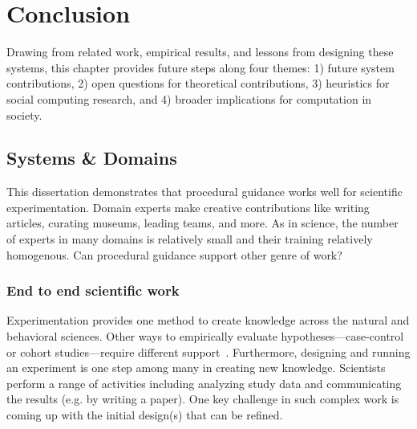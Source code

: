 
\chapter{Conclusion}
Drawing from related work, empirical results, and lessons from designing these systems, this chapter provides future steps along four themes: 1) future system contributions, 2) open questions for theoretical contributions, 3) heuristics for social computing research, and 4) broader implications for computation in society.

\section{Systems \& Domains} 

This dissertation demonstrates that procedural guidance works well for scientific experimentation. Domain experts make creative contributions like writing articles, curating museums, leading teams, and more. As in science, the number of experts in many domains is relatively small and their training relatively homogenous.  Can procedural guidance support other genre of work?

\subsection{End to end scientific work}
Experimentation provides one method to create knowledge across the natural and behavioral sciences. Other ways to empirically evaluate hypotheses---case-control or cohort studies---require different support~\cite{Murad125}. Furthermore, designing and running an experiment is one step among many in creating new knowledge. Scientists perform a range of activities including analyzing study data and communicating the results (e.g. by writing a paper). One key challenge in such complex work is coming up with the initial design(s) that can be refined.

